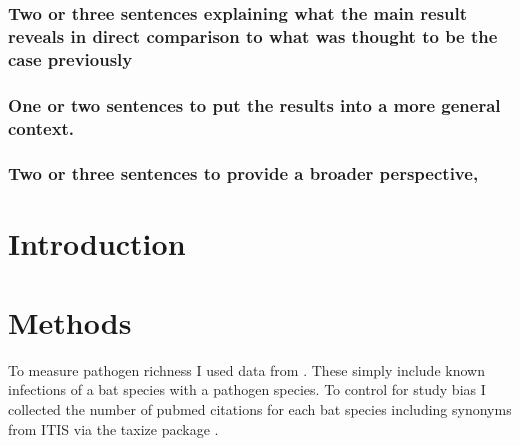 \subsubsection{Two or three sentences explaining what the main result reveals in direct comparison to what was thought to be the case previously}


\subsubsection{One or two sentences to put the results into a more general context.}



\subsubsection{Two or three sentences to provide a broader perspective, }




\clearpage
\section{Introduction}







\clearpage
\section{Methods}


To measure pathogen richness I used data from \cite{luis2013comparison}. 
These simply include known infections of a bat species with a pathogen species. 
To control for study bias I collected the number of pubmed citations for each bat species including synonyms from ITIS \cite{itis} via the taxize package \cite{chamberlain2013taxize}.



